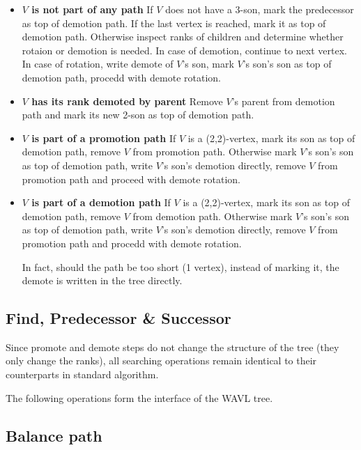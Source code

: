 \begin{itemize}

\item {\bfseries $V$ is not part of any path} If $V$ does not have a 3-son, mark the predecessor as top of demotion path. If the last vertex is reached, mark it as top of demotion path.  Otherwise inspect ranks of children and determine whether rotaion or demotion is needed. In case of demotion, continue to next vertex. In case of rotation, write demote of $V$'s son, mark $V$'s son's son as top of demotion path, procedd with demote rotation.

\item {\bfseries $V$ has its rank demoted by parent} Remove $V$'s parent from demotion path and mark its new 2-son as top of demotion path.

\item {\bfseries $V$ is part of a promotion path} If $V$ is a (2,2)-vertex, mark its son as top of demotion path, remove $V$ from promotion path. Otherwise mark $V$'s son's son as top of demotion path, write $V$'s son's demotion directly, remove $V$ from promotion path and proceed with demote rotation. 

\item {\bfseries $V$ is part of a demotion path} If $V$ is a (2,2)-vertex, mark its son as top of demotion path, remove $V$ from demotion path. Otherwise mark $V$'s son's son as top of demotion path, write $V$'s son's demotion directly, remove $V$ from promotion path and procedd with demote rotation. 

In fact, should the path be too short (1 vertex), instead of marking it, the demote is written in the tree directly.

\end{itemize}

\subsection{Find, Predecessor \& Successor}

Since promote and demote steps do not change the structure of the tree (they only change the ranks), all searching operations remain identical to their counterparts in standard algorithm.


The following operations form the interface of the WAVL tree.

\subsection{Balance path}

